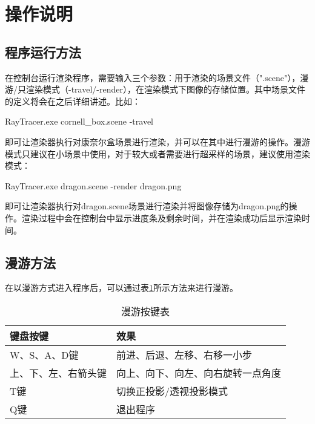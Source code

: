 \section {操作说明}
\subsection {程序运行方法}
在控制台运行渲染程序，需要输入三个参数：用于渲染的场景文件（".scene"），漫游/只渲染模式（-travel/-render），在渲染模式下图像的存储位置。其中场景文件的定义将会在之后详细讲述。比如：\\
\centerline{RayTracer.exe cornell\_box.scene -travel}
即可让渲染器执行对康奈尔盒场景进行渲染，并可以在其中进行漫游的操作。漫游模式只建议在小场景中使用，对于较大或者需要进行超采样的场景，建议使用渲染模式：
\centerline{RayTracer.exe dragon.scene -render dragon.png}
即可让渲染器执行对dragon.scene场景进行渲染并将图像存储为dragon.png的操作。渲染过程中会在控制台中显示进度条及剩余时间，并在渲染成功后显示渲染时间。

\subsection {漫游方法}
在以漫游方式进入程序后，可以通过表\ref{table:travel_keyboard}所示方法来进行漫游。
\begin{table}[h]
    \centering
    \begin{tabular}{|l|l|}
    \hline
    键盘按键 & 效果\\
    \hline
    W、S、A、D键 & 前进、后退、左移、右移一小步\\
    \hline
    上、下、左、右箭头键 & 向上、向下、向左、向右旋转一点角度\\
    \hline
    T键 & 切换正投影/透视投影模式\\
    \hline
    Q键 & 退出程序\\
    \hline
    \end{tabular}
    \caption{漫游按键表}
    \label{table:travel_keyboard}
\end{table}

